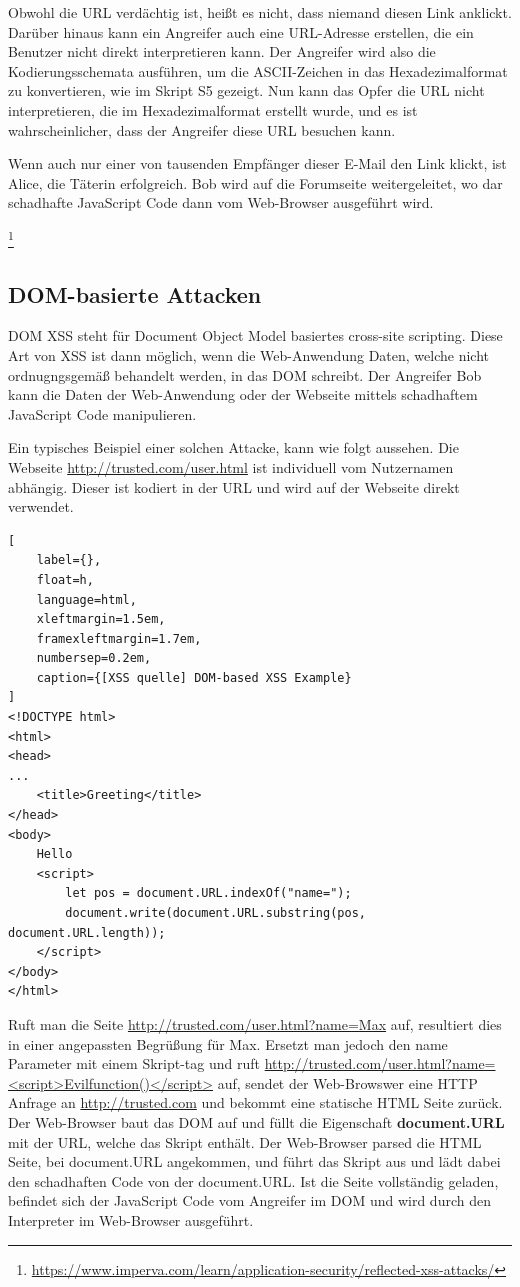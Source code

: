 Obwohl die URL verdächtig ist, heißt es nicht, dass niemand diesen Link anklickt.
Darüber hinaus kann ein Angreifer auch eine URL-Adresse erstellen, die ein Benutzer nicht direkt interpretieren kann. Der Angreifer wird also die Kodierungsschemata ausführen, um die ASCII-Zeichen in das Hexadezimalformat zu konvertieren, wie im Skript S5 gezeigt. Nun kann das Opfer die URL nicht interpretieren, die im Hexadezimalformat erstellt wurde, und es ist wahrscheinlicher, dass der Angreifer diese URL besuchen kann.\autocite[125]{gupta2015a}

Wenn auch nur einer von tausenden Empfänger dieser E-Mail den Link klickt, ist Alice, die Täterin erfolgreich. Bob wird auf die Forumseite weitergeleitet, wo dar schadhafte JavaScript Code dann vom Web-Browser ausgeführt wird.

\footnote{\url{https://www.imperva.com/learn/application-security/reflected-xss-attacks/}}

\subsection{DOM-basierte Attacken}
\label{subsection:DOM-based Attacks}

DOM XSS steht für Document Object Model basiertes cross-site scripting. Diese Art von XSS ist dann möglich, wenn die Web-Anwendung Daten, welche nicht ordnugngsgemäß behandelt werden, in das DOM schreibt.
Der Angreifer Bob kann die Daten der Web-Anwendung oder der Webseite mittels schadhaftem JavaScript Code manipulieren.

Ein typisches Beispiel einer solchen Attacke, kann wie folgt aussehen.
Die Webseite \url{http://trusted.com/user.html} ist individuell vom Nutzernamen abhängig. Dieser ist kodiert in der URL und wird auf der Webseite direkt verwendet.

\begin{lstlisting}[
	label={},
	float=h,
	language=html,
	xleftmargin=1.5em,
	framexleftmargin=1.7em,
	numbersep=0.2em,
	caption={[XSS quelle] DOM-based XSS Example}
]
<!DOCTYPE html>
<html>
<head>
...
    <title>Greeting</title>
</head>
<body>
	Hello
	<script>
		let pos = document.URL.indexOf("name=");
		document.write(document.URL.substring(pos, document.URL.length));
	</script>
</body>
</html>
\end{lstlisting}

Ruft man die Seite \url{http://trusted.com/user.html?name=Max} auf, resultiert dies in einer angepassten Begrüßung für Max. Ersetzt man jedoch den name Parameter mit einem Skript-tag und ruft \url{http://trusted.com/user.html?name=<script>Evilfunction()</script>} auf, sendet der Web-Browswer eine HTTP Anfrage an \url{http://trusted.com} und bekommt eine statische HTML Seite zurück. Der Web-Browser baut das DOM auf und füllt die Eigenschaft \textbf{document.URL} mit der URL, welche das Skript enthält.
Der Web-Browser parsed die HTML Seite, bei document.URL angekommen, und führt das Skript aus und lädt dabei den schadhaften Code von der document.URL. Ist die Seite vollständig geladen, befindet sich der JavaScript Code vom Angreifer im DOM und wird durch den Interpreter im Web-Browser ausgeführt.

